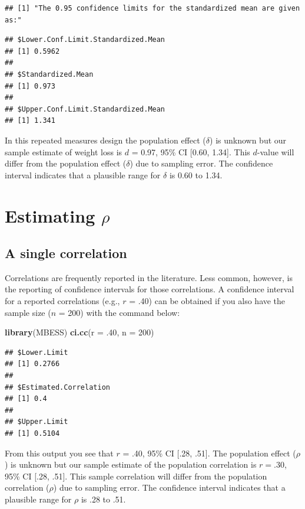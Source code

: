 \documentclass[
]{krantz}
\makeatletter
\newenvironment{Shaded}{\begin{snugshade}}{\end{snugshade}}
\newcommand{\DataTypeTok}[1]{\textcolor[rgb]{0.27,0.27,0.27}{#1}}
\newcommand{\DecValTok}[1]{\textcolor[rgb]{0.06,0.06,0.06}{#1}}
\newcommand{\FloatTok}[1]{\textcolor[rgb]{0.06,0.06,0.06}{#1}}
\newcommand{\KeywordTok}[1]{\textcolor[rgb]{0.27,0.27,0.27}{\textbf{#1}}}
\newcommand{\NormalTok}[1]{#1}
\newenvironment{kframe}{%
\medskip{}
\setlength{\fboxsep}{.8em}
 \def\at@end@of@kframe{}%
 \ifinner\ifhmode%
  \def\at@end@of@kframe{\end{minipage}}%
  \begin{minipage}{\columnwidth}%
 \fi\fi%
 \def\FrameCommand##1{\hskip\@totalleftmargin \hskip-\fboxsep
 \colorbox{shadecolor}{##1}\hskip-\fboxsep
     \hskip-\linewidth \hskip-\@totalleftmargin \hskip\columnwidth}%
 \MakeFramed {\advance\hsize-\width
   \@totalleftmargin\z@ \linewidth\hsize
   \@setminipage}}%
 {\par\unskip\endMakeFramed%
 \at@end@of@kframe}
\renewenvironment{Shaded}{\begin{kframe}}{\end{kframe}}
\makeatother
\begin{document}
\begin{verbatim}
## [1] "The 0.95 confidence limits for the standardized mean are given as:"
\end{verbatim}

\begin{verbatim}
## $Lower.Conf.Limit.Standardized.Mean
## [1] 0.5962
## 
## $Standardized.Mean
## [1] 0.973
## 
## $Upper.Conf.Limit.Standardized.Mean
## [1] 1.341
\end{verbatim}

In this repeated measures design the population effect (\(\delta\)) is unknown but our sample estimate of weight loss is \(d\) = 0.97, 95\% CI {[}0.60, 1.34{]}. This \(d\)-value will differ from the population effect (\(\delta\)) due to sampling error. The confidence interval indicates that a plausible range for \(\delta\) is 0.60 to 1.34.

\hypertarget{estimating-rho}{%
\section{\texorpdfstring{Estimating \(\rho\)}{Estimating \textbackslash rho}}\label{estimating-rho}}

\hypertarget{a-single-correlation}{%
\subsection{A single correlation}\label{a-single-correlation}}

Correlations are frequently reported in the literature. Less common, however, is the reporting of confidence intervals for those correlations. A confidence interval for a reported correlations (e.g., \(r\) = .40) can be obtained if you also have the sample size (\(n\) = 200) with the command below:

\begin{Shaded}
\begin{Highlighting}[]
\KeywordTok{library}\NormalTok{(MBESS)}
\KeywordTok{ci.cc}\NormalTok{(}\DataTypeTok{r =} \FloatTok{.40}\NormalTok{, }\DataTypeTok{n =} \DecValTok{200}\NormalTok{)}
\end{Highlighting}
\end{Shaded}

\begin{verbatim}
## $Lower.Limit
## [1] 0.2766
## 
## $Estimated.Correlation
## [1] 0.4
## 
## $Upper.Limit
## [1] 0.5104
\end{verbatim}

From this output you see that \(r\) = .40, 95\% CI {[}.28, .51{]}. The population effect (\(\rho\)) is unknown but our sample estimate of the population correlation is \(r = .30\), 95\% CI {[}.28, .51{]}. This sample correlation will differ from the population correlation (\(\rho\)) due to sampling error. The confidence interval indicates that a plausible range for \(\rho\) is .28 to .51.
\end{document}
